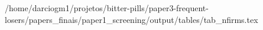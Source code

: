 /home/darciogm1/projetos/bitter-pills/paper3-frequent-losers/papers_finais/paper1_screening/output/tables/tab_nfirms.tex